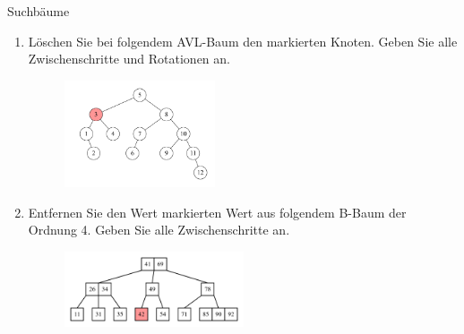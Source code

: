 \documentclass[11pt,a4paper]{article}
\begin{document}
\begin{aufgabe}{6}{Suchbäume}
    \begin{enumerate}
        \item Löschen Sie bei folgendem AVL-Baum den markierten Knoten. Geben Sie alle Zwischenschritte und Rotationen an.
        \begin{figure}[h!]
            \centering
            \includegraphics[width=0.42\textwidth]{img/avl.png}
        \end{figure}
        \FloatBarrier   
        \item Entfernen Sie den Wert markierten Wert aus folgendem B-Baum der Ordnung 4. Geben Sie alle Zwischenschritte an.
        \begin{figure}[h!]
            \centering
            \includegraphics[width=0.5\textwidth]{img/b_tree.png}
        \end{figure}
        \FloatBarrier   
    \end{enumerate}
\end{aufgabe}
\end{document}
